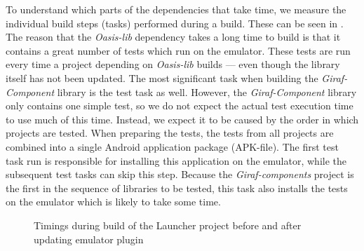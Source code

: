 To understand which parts of the dependencies that take time, we measure the individual build steps (tasks) performed during a build. These can be seen in . The reason that the \emph{Oasis-lib} dependency takes a long time to build is that it contains a great number of tests which run on the emulator. These tests are run every time a project depending on \emph{Oasis-lib} builds --- even though the library itself has not been updated. The most significant task when building the \emph{Giraf-Component} library is the test task as well. However, the \emph{Giraf-Component} library only contains one simple test, so we do not expect the actual test execution time to use much of this time. Instead, we expect it to be caused by the order in which projects are tested. When preparing the tests, the tests from all projects are combined into a single Android application package (APK-file). The first test task run is responsible for installing this application on the emulator, while the subsequent test tasks can skip this step. Because the \emph{Giraf-components} project is the first in the sequence of libraries to be tested, this task also installs the tests on the emulator which is likely to take some time.
\begin{figure}
\centering
{}
\caption{Timings during build of the Launcher project before and after updating emulator plugin}\label{fig:launcher_build_times_1}
\end{figure}

